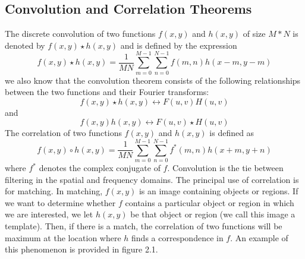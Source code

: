 \subsection{Convolution and Correlation Theorems}
The discrete convolution of two functions $f(x, y)$ and $h(x, y)$ of size $ M * N$ is denoted by $f(x, y) \star h(x, y)$ and is defined by the expression
\begin{equation}
f(x, y) \star h(x, y) = \frac{1}{MN}\sum_{m = 0}^{M - 1}\sum_{n = 0}^{N - 1}f(m, n)h(x - m, y-m)
\end{equation}
we also know that the convolution theorem consists of the following relationships between the two functions and their Fourier transforms:
\begin{equation}
f(x, y) \star h(x, y) \leftrightarrow F(u, v)H(u, v)
\end{equation}
and 
\begin{equation}
f(x, y)h(x, y) \leftrightarrow F(u, v) \star H(u, v)
\end{equation}
The correlation of two functions $f(x, y)$ and $h(x, y)$ is defined as
\begin{equation}
f(x, y)\circ h(x, y) = \frac{1}{MN} \sum_{m = 0}^{M - 1}\sum_{n = 0}^{N - 1}f^*(m, n)h(x + m, y + n)
\end{equation}
where $f^*$ denotes the complex conjugate of $f$. Convolution is the tie between filtering in the spatial and frequency domains. The principal use of correlation is for matching. In matching, $f(x, y)$ is an image containing objects or regions. If we want to determine whether $f$ contains a particular object or region in which we are interested, we let $h(x, y)$ be that object or region (we call this image a template). Then, if there is a match, the correlation of two functions will be maximum  at the location where $h$ finds a correspondence in $f$. An example of this phenomenon is provided in figure 2.1.
